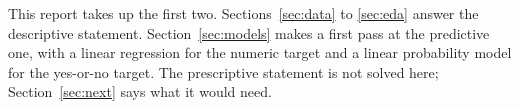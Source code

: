 This report takes up the first two. Sections~\ref{sec:data} to \ref{sec:eda} answer the descriptive statement. Section~\ref{sec:models} makes a first pass at the predictive one, with a linear regression for the numeric target and a linear probability model for the yes-or-no target. The prescriptive statement is not solved here; Section~\ref{sec:next} says what it would need.
